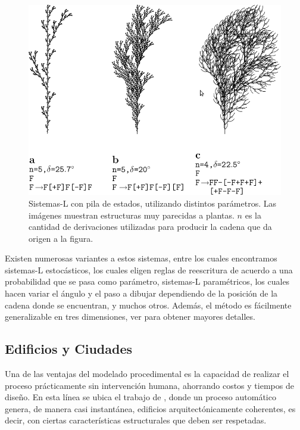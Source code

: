 \begin{figure}
\center
\includegraphics[width=13cm]{figures/sistemalcorchete}
\caption[Sistemas-L con pila de estados, utilizando distintos parámetros]{Sistemas-L con pila de estados, utilizando distintos parámetros. Las imágenes muestran estructuras muy parecidas a plantas. $n$ es la cantidad de derivaciones utilizadas para producir la cadena que da origen a la figura.}
\label{fg:sistemasLcorchete}
\end{figure}


Existen numerosas variantes a estos sistemas, entre los cuales encontramos sistemas-L estocásticos, los cuales eligen reglas de reescritura de acuerdo a una probabilidad que se pasa como parámetro, sistemas-L paramétricos, los cuales hacen variar el ángulo y el paso a dibujar dependiendo de la posición de la cadena donde se encuentran, y muchos otros.
Además, el método es fácilmente generalizable en tres dimensiones, ver \cite{Prusinkiewicz1990} para obtener mayores detalles.

\subsection{Edificios y Ciudades}
Una de las ventajas del modelado procedimental es la capacidad de realizar el proceso prácticamente sin intervención humana, ahorrando costos y tiempos de diseño.
En esta línea se ubica el trabajo de \cite{Wonka2003}, donde un proceso automático genera, de manera casi instantánea, edificios arquitectónicamente coherentes, es decir, con ciertas características estructurales que deben ser respetadas.

